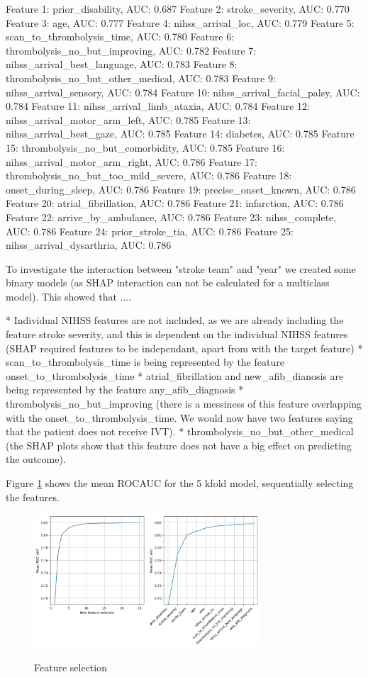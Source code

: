 Feature  1: prior\_disability, AUC: 0.687
Feature  2: stroke\_severity, AUC: 0.770
Feature  3: age, AUC: 0.777
Feature  4: nihss\_arrival\_loc, AUC: 0.779
Feature  5: scan\_to\_thrombolysis\_time, AUC: 0.780
Feature  6: thrombolysis\_no\_but\_improving, AUC: 0.782
Feature  7: nihss\_arrival\_best\_language, AUC: 0.783
Feature  8: thrombolysis\_no\_but\_other\_medical, AUC: 0.783
Feature  9: nihss\_arrival\_sensory, AUC: 0.784
Feature 10: nihss\_arrival\_facial\_palsy, AUC: 0.784
Feature 11: nihss\_arrival\_limb\_ataxia, AUC: 0.784
Feature 12: nihss\_arrival\_motor\_arm\_left, AUC: 0.785
Feature 13: nihss\_arrival\_best\_gaze, AUC: 0.785
Feature 14: diabetes, AUC: 0.785
Feature 15: thrombolysis\_no\_but\_comorbidity, AUC: 0.785
Feature 16: nihss\_arrival\_motor\_arm\_right, AUC: 0.786
Feature 17: thrombolysis\_no\_but\_too\_mild\_severe, AUC: 0.786
Feature 18: onset\_during\_sleep, AUC: 0.786
Feature 19: precise\_onset\_known, AUC: 0.786
Feature 20: atrial\_fibrillation, AUC: 0.786
Feature 21: infarction, AUC: 0.786
Feature 22: arrive\_by\_ambulance, AUC: 0.786
Feature 23: nihss\_complete, AUC: 0.786
Feature 24: prior\_stroke\_tia, AUC: 0.786
Feature 25: nihss\_arrival\_dysarthria, AUC: 0.786

To investigate the interaction between "stroke team" and "year" we created some binary models (as SHAP interaction can not be calculated for a multiclass model). This showed that ....

* Individual NIHSS features are not included, as we are already including the feature stroke severity, and this is dependent on the individual NIHSS features (SHAP required features to be independant, apart from with the target feature)
* scan\_to\_thrombolysis\_time is being represented by the feature onset\_to\_thrombolysis\_time
* atrial\_fibrillation and new\_afib\_dianosis are being represented by the feature any\_afib\_diagnosis
* thrombolysis\_no\_but\_improving (there is a messiness of this feature overlapping with the onset\_to\_thrombolysis\_time. We would now have two features saying that the patient does not receive IVT).
* thrombolysis\_no\_but\_other\_medical (the SHAP plots show that this feature does not have a big effect on predicting the outcome).

Figure \ref{fig:feature_selection} shows the mean ROCAUC for the 5 kfold model, sequentially selecting the features.
\begin{figure}[!h]
    \centering
    \includegraphics[width=0.75\textwidth]{./images/020_feature_selection.jpg}\\
    \caption{Feature selection}
    \label{fig:feature_selection}
\end{figure}


